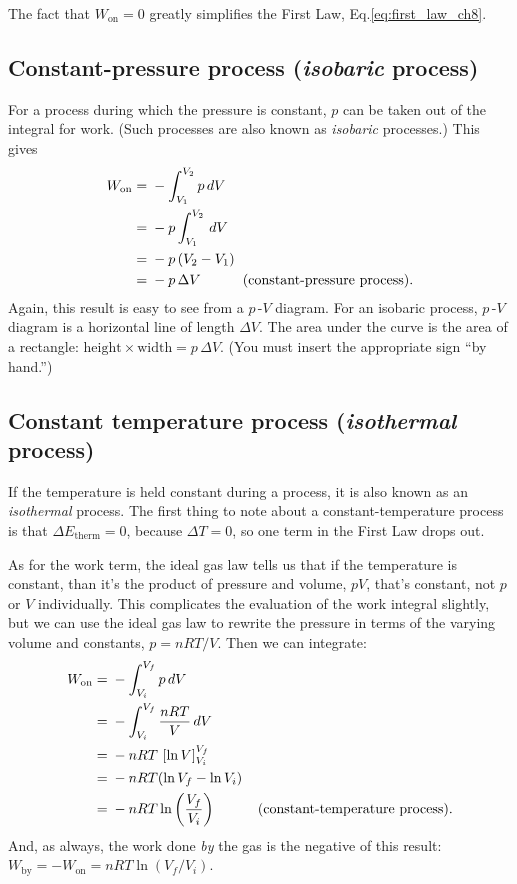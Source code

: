 The  fact that $W_\text{on}=0$ greatly simplifies the First Law, 
Eq.\eqref{eq:first_law_ch8}.

\subsection*{Constant-pressure process (\textit{isobaric} process)}
For a process during which the pressure is constant, $p$ can
be taken out of the integral for work.  (Such processes are also
known as \textit{isobaric} processes.)  This gives
\begin{eqnarray}
W_\text{on} =\mathstrut & -\int_{V_1}^{V_2} p\, dV  \\
            =\mathstrut & -p\int_{V_1}^{V_2} \, dV  \\
            =\mathstrut & -p\, (V_2 - V_1)  \\
            =\mathstrut & -p\, \Delta V\quad\quad\quad\text{(constant-pressure process)}.
\end{eqnarray}
Again, this result is easy to see from a $p$\,-$V$ diagram.
For an isobaric process, $p$\,-$V$ diagram is a horizontal line 
of length $\Delta V$.  The area under the curve is the area 
of a rectangle: $\text{height}\times\text{width} = p\, \Delta V$.
(You must insert the  appropriate sign ``by hand.'')


\subsection*{Constant temperature process (\textit{isothermal} process)} 
If the temperature is held constant during a process, it is also known
as an \textit{isothermal} process.  The first thing to note about a 
constant-temperature process is that $\Delta E_\text{therm}= 0$,
because $\Delta T=0$, so one term in the First Law drops out.

As for the work term, the ideal gas law tells us that if 
the temperature is constant, than it's the product of pressure and 
volume, $pV$, that's  constant, not $p$ or $V$ individually.  This complicates
the evaluation of the work integral slightly, but we can use the ideal gas 
law to rewrite the pressure in terms of the varying volume and 
constants, $p = nRT/V$.  Then we can integrate: 
\begin{eqnarray}
  W_\text{on} =\mathstrut & -\int_{V_i}^{V_f}p\,dV  \\
              =\mathstrut & -\int_{V_i}^{V_f}\frac{nRT}{V}\,dV  \\
              =\mathstrut & -nRT\,\left[\ln V\right]_{V_i}^{V_f}  \\
              =\mathstrut & -nRT( \ln V_f -\ln V_i)  \\
              =\mathstrut & -nRT\ln\left(\frac{V_f}{V_i}\right) \quad\quad\quad 
               \text{(constant-temperature process)}.
\end{eqnarray}
And, as always, the work done \textit{by} the gas is the negative
of this result: $W_\text{by} = -W_\text{on} = nRT\ln (V_f/V_i)$.

